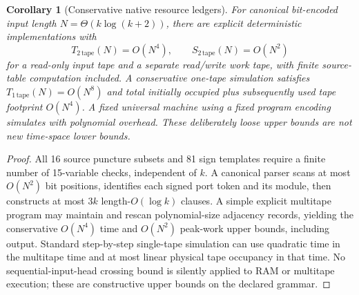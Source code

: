 \documentclass[11pt]{article}
\newtheorem{corollary}{Corollary}
\begin{document}
\begin{corollary}[Conservative native resource ledgers]\label{cor:ledger}
For canonical bit-encoded input length $N=\Theta(k\log(k+2))$, there are explicit deterministic implementations with
\[
 T_{\mathrm{2\,tape}}(N)=O(N^4),\qquad S_{\mathrm{2\,tape}}(N)=O(N^2)
\]
for a read-only input tape and a separate read/write work tape, with finite source-table computation included. A conservative one-tape simulation satisfies $T_{\mathrm{1\,tape}}(N)=O(N^8)$ and total initially occupied plus subsequently used tape footprint $O(N^4)$. A fixed universal machine using a fixed program encoding simulates with polynomial overhead. These deliberately loose upper bounds are not new time-space lower bounds.
\end{corollary}
\begin{proof}
All 16 source puncture subsets and 81 sign templates require a finite number of 15-variable checks, independent of $k$. A canonical parser scans at most $O(N^2)$ bit positions, identifies each signed port token and its module, then constructs at most $3k$ length-$O(\log k)$ clauses. A simple explicit multitape program may maintain and rescan polynomial-size adjacency records, yielding the conservative $O(N^4)$ time and $O(N^2)$ peak-work upper bounds, including output. Standard step-by-step single-tape simulation can use quadratic time in the multitape time and at most linear physical tape occupancy in that time. No sequential-input-head crossing bound is silently applied to RAM or multitape execution; these are constructive upper bounds on the declared grammar.
\end{proof}
\end{document}
